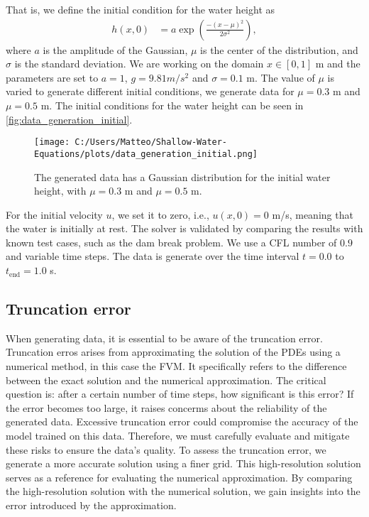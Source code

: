 That is, we define the initial condition for the water height as
\begin{align}\label{eq:1D_swe_ic_gaussian}
    h(x,0) &= a \exp{\left(\frac{-{(x-\mu)}^2}{2\sigma^2}\right)},
\end{align}
where $a$ is the amplitude of the Gaussian, $\mu$ is the center of the distribution, and $\sigma$ is the standard deviation.
We are working on the domain $x \in [0,1]$ m and the parameters are set to $a = 1$, $g = 9.81 m/s^2$ and $\sigma = 0.1$ m.
The value of $\mu$ is varied to generate different initial conditions, we generate data for $\mu = 0.3$ m and $\mu = 0.5$ m.
The initial conditions for the water height can be seen in \autoref{fig:data_generation_initial}.
\begin{figure}[H]
    \centering
    \texttt{[image: C:/Users/Matteo/Shallow-Water-Equations/plots/data\_generation\_initial.png]}
    \caption{The generated data has a Gaussian distribution for the initial water height, with $\mu = 0.3$ m and $\mu = 0.5$ m.}\label{fig:data_generation_initial}
\end{figure}
For the initial velocity $u$, we set it to zero, i.e., $u(x,0) = 0$ m/s, meaning that the water is initially at rest.
The solver is validated by comparing the results with known test cases, such as the dam break problem. 
We use a CFL number of $0.9$ and variable time steps.
The data is generate over the time interval $t = 0.0$ to $t_{\text{end}} = 1.0$ s.

\subsection*{Truncation error}
When generating data, it is essential to be aware of the truncation error.
Truncation erros arises from approximating the solution of the PDEs using a numerical method, in this case the FVM.
It specifically refers to the difference between the exact solution and the numerical approximation.
The critical question is: after a certain number of time steps, how significant is this error?
If the error becomes too large, it raises concerms about the reliability of the generated data.
Excessive truncation error could compromise the accuracy of the model trained on this data.
Therefore, we must carefully evaluate and mitigate these risks to ensure the data's quality.
To assess the truncation error, we generate a more accurate solution using a finer grid.
This high-resolution solution serves as a reference for evaluating the numerical approximation.
By comparing the high-resolution solution with the numerical solution, we gain insights into the error introduced by the approximation.

